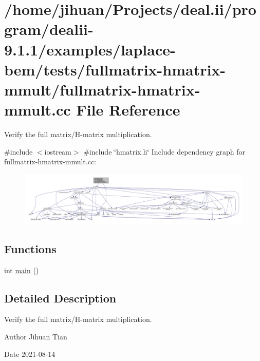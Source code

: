 \hypertarget{fullmatrix-hmatrix-mmult_8cc}{}\section{/home/jihuan/\+Projects/deal.ii/program/dealii-\/9.1.1/examples/laplace-\/bem/tests/fullmatrix-\/hmatrix-\/mmult/fullmatrix-\/hmatrix-\/mmult.cc File Reference}
\label{fullmatrix-hmatrix-mmult_8cc}


Verify the full matrix/\+H-\/matrix multiplication.  


{\ttfamily \#include $<$iostream$>$}\newline
{\ttfamily \#include \char`\"{}hmatrix.\+h\char`\"{}}\newline
Include dependency graph for fullmatrix-\/hmatrix-\/mmult.cc\+:\nopagebreak
\begin{figure}[H]
\begin{center}
\leavevmode
\includegraphics[width=350pt]{fullmatrix-hmatrix-mmult_8cc__incl}
\end{center}
\end{figure}
\subsection*{Functions}
\begin{DoxyCompactItemize}
\item 
int \hyperlink{fullmatrix-hmatrix-mmult_8cc_ae66f6b31b5ad750f1fe042a706a4e3d4}{main} ()
\end{DoxyCompactItemize}


\subsection{Detailed Description}
Verify the full matrix/\+H-\/matrix multiplication. 

\begin{DoxyAuthor}{Author}
Jihuan Tian 
\end{DoxyAuthor}
\begin{DoxyDate}{Date}
2021-\/08-\/14 
\end{DoxyDate}


